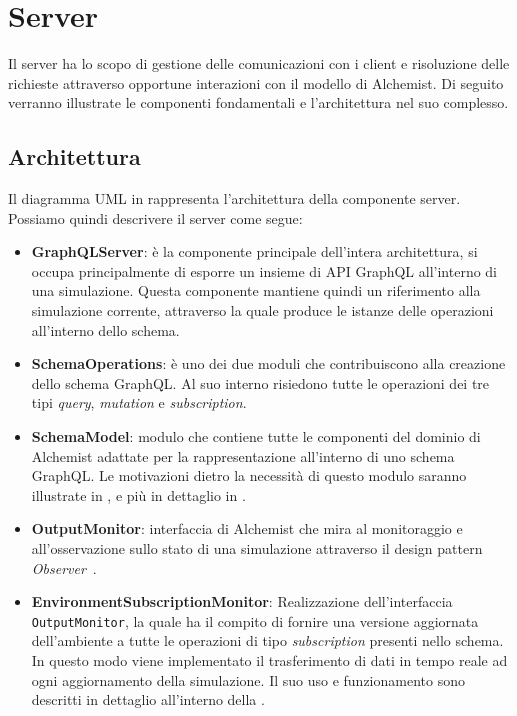 \section{Server}\label{sec:server}
Il server ha lo scopo di gestione delle comunicazioni con i client e risoluzione delle richieste attraverso opportune interazioni con il modello
di Alchemist. Di seguito verranno illustrate le componenti fondamentali e l'architettura nel suo complesso.
%

\subsection{Architettura}\label{ssec:server-arch}
Il diagramma UML in  rappresenta l'architettura della componente server.
Possiamo quindi descrivere il server come segue:
\begin{itemize}
    \item \textbf{GraphQLServer}: è la componente principale dell'intera architettura, si occupa principalmente di esporre un insieme di API GraphQL all'interno di una simulazione.
        Questa componente mantiene quindi un riferimento alla simulazione corrente, attraverso la quale produce le istanze delle operazioni all'interno dello schema.
    \item \textbf{SchemaOperations}: è uno dei due moduli che contribuiscono alla creazione dello schema GraphQL. Al suo interno risiedono tutte le operazioni dei tre tipi \textit{query},
        \textit{mutation} e \textit{subscription}.
    \item \textbf{SchemaModel}: modulo che contiene tutte le componenti del dominio di Alchemist adattate per la rappresentazione all'interno di uno schema GraphQL. Le motivazioni dietro 
        la necessità di questo modulo saranno illustrate in , e più in dettaglio in .
    \item \textbf{OutputMonitor}: interfaccia di Alchemist che mira al monitoraggio e all'osservazione sullo stato di una simulazione attraverso il design pattern \textit{Observer}~\cite{design-patterns}.
    \item \textbf{EnvironmentSubscriptionMonitor}: Realizzazione dell'interfaccia \texttt{OutputMonitor}, la quale ha il compito di fornire una versione aggiornata dell'ambiente a tutte le operazioni
        di tipo \textit{subscription} presenti nello schema. In questo modo viene implementato il trasferimento di dati in tempo reale ad ogni aggiornamento della simulazione. Il suo uso e funzionamento
        sono descritti in dettaglio all'interno della .
\end{itemize}


